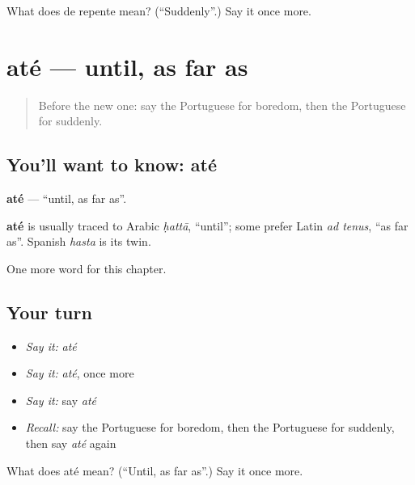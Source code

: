 \begin{tcolorbox}[breakable,colback=teal!4,colframe=teal!35!black,title={Before you move on}]
What does de repente mean? (\textquotedblleft{}Suddenly\textquotedblright{}.) Say it once more.
\end{tcolorbox}
\section[até]{até — until, as far as}

\label{lesson:PT-C182-ate}



\begin{quote}
Before the new one: say the Portuguese for boredom, then the Portuguese for suddenly.
\end{quote}

\subsection*{You'll want to know: até}
\textbf{até} — \textquotedblleft{}until, as far as\textquotedblright{}.

\begin{cousinweb}
\textbf{até} is usually traced to Arabic \emph{ḥattā}, \textquotedblleft{}until\textquotedblright{}; some prefer Latin \emph{ad tenus}, \textquotedblleft{}as far as\textquotedblright{}. Spanish \emph{hasta} is its twin.
\end{cousinweb}

\begin{grammarlens}[title={What you've built}]
One more word for this chapter.
\end{grammarlens}

\subsection*{Your turn}
\begin{itemize}
\raggedright
  \item \emph{Say it:} \emph{até}
  \item \emph{Say it:} \emph{até}, once more
  \item \emph{Say it:} say \emph{até}
  \item \emph{Recall:} say the Portuguese for boredom, then the Portuguese for suddenly, then say \emph{até} again
\end{itemize}

\begin{tcolorbox}[breakable,colback=teal!4,colframe=teal!35!black,title={Before you move on}]
What does até mean? (\textquotedblleft{}Until, as far as\textquotedblright{}.) Say it once more.
\end{tcolorbox}
